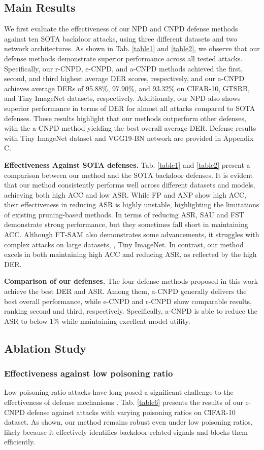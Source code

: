 \subsection{Main Results}
We first evaluate the effectiveness of our NPD and CNPD defense methods against ten SOTA backdoor attacks, using three different datasets and two network architectures. As shown in Tab. \ref{table1} and \ref{table2},  we observe that our defense methods demonstrate superior performance across all tested attacks. Specifically, our r-CNPD, e-CNPD, and a-CNPD methods achieved the first, second, and third highest average DER scores, respectively, and our a-CNPD achieves average DERs of 95.88\%, 97.90\%, and 93.32\% on CIFAR-10, GTSRB, and Tiny ImageNet datasets, respectively. Additionaly, our NPD also shows superior performance in terms of DER for almost all attacks compared to SOTA defenses. These results highlight that our methods outperform other defenses, with the a-CNPD method yielding the best overall average DER. Defense results with Tiny ImageNet dataset and VGG19-BN network are provided in Appendix C.

\textbf{Effectiveness Against SOTA defenses.}
Tab. \ref{table1} and \ref{table2} present a comparison between our method and the SOTA backdoor defenses. It is evident that our method consistently performs well across different datasets and models, achieving both high ACC and low ASR. While FP and ANP show high ACC, their effectiveness in reducing ASR is highly unstable, highlighting the limitations of existing pruning-based methods. In terms of reducing ASR, SAU and FST demonstrate strong performance, but they sometimes fall short in maintaining ACC. Although FT-SAM also demonstrates some advancements, it struggles with complex attacks on large datasets, \ie, Tiny ImageNet. In contrast, our method excels in both maintaining high ACC and reducing ASR, as reflected by the high DER. 

\textbf{Comparison of our defenses.}
The four defense methods proposed in this work achieve the best DER and ASR. Among them, a-CNPD generally delivers the best overall performance, while e-CNPD and r-CNPD show comparable results, ranking second and third, respectively. Specifically, a-CNPD is able to reduce the ASR to below 1\% while maintaining excellent model utility.

\subsection{Ablation Study}
\subsubsection{Effectiveness against low poisoning ratio}
Low poisoning-ratio attacks have long posed a significant challenge to the effectiveness of defense mechanisms \cite{zhang2024reliable,qi2023revisiting,ma2023dihba}. Tab. \ref{table6} presents the results of our e-CNPD defense against attacks with varying poisoning ratios on CIFAR-10 dataset. As shown, our method remains robust even under low poisoning ratios, likely because it effectively identifies backdoor-related signals and blocks them efficiently.

